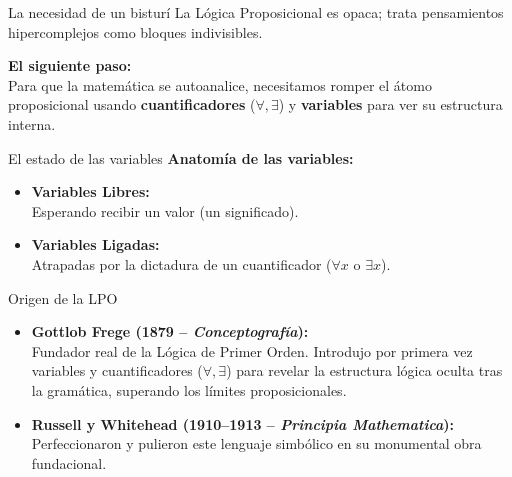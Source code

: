\documentclass[10pt, aspectratio=169]{beamer}
\begin{document}
\begin{frame}{La necesidad de un bisturí}
    \vspace{0.5cm}
    \Large
    La Lógica Proposicional es opaca; trata pensamientos hipercomplejos como bloques indivisibles. 
    
    \vspace{0.8cm}
    \alert{\textbf{El siguiente paso:}} \\
    \normalsize
    \vspace{0.3cm}
    Para que la matemática se autoanalice, necesitamos romper el átomo proposicional usando \textbf{cuantificadores} ($\forall, \exists$) y \textbf{variables} para ver su estructura interna.
\end{frame}
\begin{frame}{El estado de las variables}
    \vspace{0.5cm}
    \Large \alert{\textbf{Anatomía de las variables:}}
    
    \vspace{0.6cm}
    \normalsize
    \begin{itemize}
        \setlength\itemsep{0.6cm}
        \item \textbf{Variables Libres:}\\ 
        Esperando recibir un valor (un significado).
        \item \textbf{Variables Ligadas:}\\ 
        Atrapadas por la dictadura de un cuantificador ($\forall x$ o $\exists x$).
    \end{itemize}
\end{frame}


\begin{frame}{Origen de la LPO}
    \vspace{0.2cm}
    
    \vspace{0.5cm}
    \normalsize
    \begin{itemize}
        \setlength\itemsep{0.4cm}
        \item \textbf{Gottlob Frege (1879 -- \textit{Conceptografía}):} \\
        Fundador real de la Lógica de Primer Orden. Introdujo por primera vez variables y cuantificadores ($\forall, \exists$) para revelar la estructura lógica oculta tras la gramática, superando los límites proposicionales.
        
        \item \textbf{Russell y Whitehead (1910--1913 -- \textit{Principia Mathematica}):} \\
        Perfeccionaron y pulieron este lenguaje simbólico en su monumental obra fundacional.
        
    \end{itemize}
\end{frame}
\end{document}
